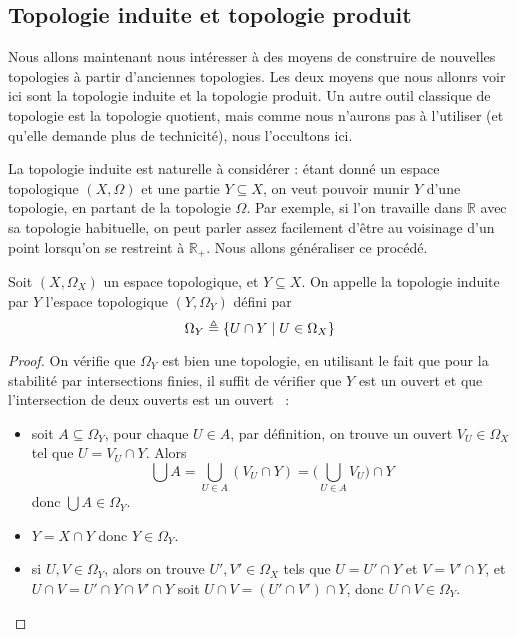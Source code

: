 \subsection{Topologie induite et topologie produit}

Nous allons maintenant nous intéresser à des moyens de construire de nouvelles
topologies à partir d'anciennes topologies. Les deux moyens que nous allonrs
voir ici sont la topologie induite et la topologie produit. Un autre outil
classique de topologie est la topologie quotient, mais comme nous n'aurons pas à
l'utiliser (et qu'elle demande plus de technicité), nous l'occultons ici.

La topologie induite est naturelle à considérer : étant donné un espace
topologique $(X,\Omega)$ et une partie $Y\subseteq X$, on veut pouvoir munir $Y$
d'une topologie, en partant de la topologie $\Omega$. Par exemple, si l'on
travaille dans $\mathbb R$ avec sa topologie habituelle, on peut parler assez
facilement d'être au voisinage d'un point lorsqu'on se restreint à
$\mathbb R_+$. Nous allons généraliser ce procédé.

\begin{definition}
  Soit $(X,\Omega_X)$ un espace topologique, et $Y\subseteq X$. On appelle la
  topologie induite par $Y$ l'espace topologique $(Y,\Omega_Y)$ défini par
  \[\Omega_Y \triangleq \{U \cap Y \mid U \in \Omega_X\}\]
\end{definition}

\begin{proof}
  On vérifie que $\Omega_Y$ est bien une topologie, en utilisant le fait que
  pour la stabilité par intersections finies, il suffit de vérifier que $Y$ est
  un ouvert et que l'intersection de deux ouverts est un ouvert~ :
  \begin{itemize}
  \item soit $A\subseteq \Omega_Y$, pour chaque $U\in A$, par définition, on
    trouve un ouvert $V_U\in \Omega_X$ tel que $U = V_U \cap Y$. Alors
    \[\bigcup A = \bigcup_{U\in A} (V_U\cap Y) =
    \Bigg(\bigcup_{U\in A} V_U\Bigg)\cap Y\]
    donc $\bigcup A \in \Omega_Y$.
  \item $Y = X \cap Y$ donc $Y\in \Omega_Y$.
  \item si $U,V\in\Omega_Y$, alors on trouve $U',V'\in\Omega_X$ tels que
    $U = U'\cap Y$ et $V = V'\cap Y$, et $U\cap V = U'\cap Y \cap V'\cap Y$
    soit $U\cap V = (U'\cap V')\cap Y$, donc $U\cap V \in \Omega_Y$.
  \end{itemize}
\end{proof}

